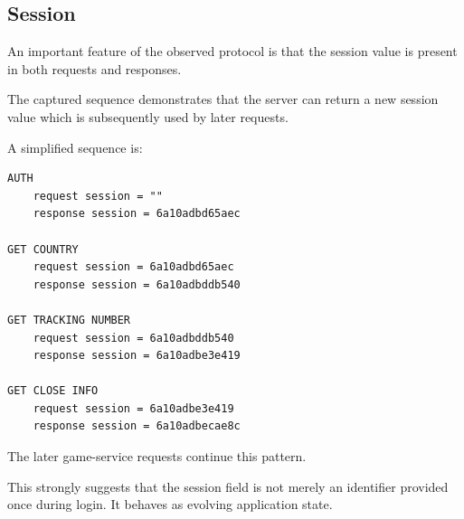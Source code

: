 \subsection{Session}

An important feature of the observed protocol is that the session value is
present in both requests and responses.

The captured sequence demonstrates that the server can return a new session
value which is subsequently used by later requests.

A simplified sequence is:

\begin{lstlisting}
AUTH
    request session = ""
    response session = 6a10adbd65aec

GET COUNTRY
    request session = 6a10adbd65aec
    response session = 6a10adbddb540

GET TRACKING NUMBER
    request session = 6a10adbddb540
    response session = 6a10adbe3e419

GET CLOSE INFO
    request session = 6a10adbe3e419
    response session = 6a10adbecae8c
\end{lstlisting}

The later game-service requests continue this pattern.

This strongly suggests that the session field is not merely an identifier
provided once during login.  It behaves as evolving application state.

\newpage
